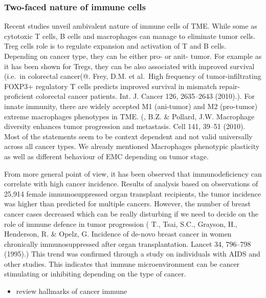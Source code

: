 \documentclass[12pt,]{book}
\providecommand{\tightlist}{%
  \setlength{\itemsep}{0pt}\setlength{\parskip}{0pt}}
\theoremstyle{definition}
\theoremstyle{definition}
\theoremstyle{definition}
\theoremstyle{remark}
\begin{document}
\hypertarget{two-faced-nature-of-immune-cells}{%
\subsubsection{Two-faced nature of immune
cells}\label{two-faced-nature-of-immune-cells}}

Recent studies unveil ambivalent nature of immune cells of TME. While
some as cytotoxic T cells, B cells and macrophages can manage to
eliminate tumor cells. Treg cells role is to regulate expansion and
activation of T and B cells. Depending on cancer type, they can be
either pro- or anit- tumor. For example as it has been shown for Tregs,
they can be also associated with improved survival (i.e.~in colorectal
cancer(@. Frey, D.M. et al.~High frequency of tumor-infiltrating FOXP3+
regulatory T cells predicts improved survival in mismatch
repair-proficient colorectal cancer patients. Int. J. Cancer 126,
2635--2643 (2010).). For innate immunity, there are widely accepted M1
(ani-tumor) and M2 (pro-tumor) extreme macrophages phenotypes in TME.
(\citet{Qian}, B.Z. \& Pollard, J.W. Macrophage diversity enhances tumor
progression and metastasis. Cell 141, 39--51 (2010). Most of the
statements seem to be context dependent and not valid universally across
all cancer types. We already mentioned Macrophages phenotypic plasticity
as well as different behaviour of EMC depending on tumor stage.

From more general point of view, it has been observed that
immunodeficiency can correlate with high cancer incidence. Results of
analysis based on observations of 25,914 female immunosuppressed organ
transplant recipients, the tumor incidence was higher than predicted for
multiple cancers. However, the number of breast cancer cases decreased
which can be really disturbing if we need to decide on the role of
immune defence in tumor progression (\citet{Stewart} T., Tsai, S.C.,
Grayson, H., Henderson, R. \& Opelz, G. Incidence of de-novo breast
cancer in women chronically immunosuppressed after organ
transplantation. Lancet 34, 796--798 (1995).) This trend was confirmed
through a study on individuals with AIDS and other studies. This
indicates that immune microenvironment can be cancer stimulating or
inhibiting depending on the type of cancer.

\begin{itemize}
\tightlist
\item
  review hallmarks of cancer immune
\end{itemize}
\end{document}
